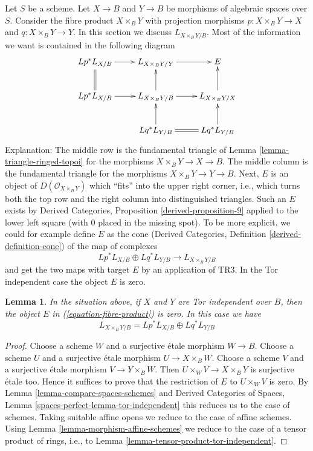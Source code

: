 \documentclass{stacks-project}
\theoremstyle{plain}
\newtheorem{lemma}[subsection]{Lemma}
\theoremstyle{definition}
\theoremstyle{remark}
\numberwithin{equation}{subsection}
\begin{document}
\noindent
Let $S$ be a scheme. Let $X \to B$ and $Y \to B$ be morphisms of algebraic
spaces over $S$. Consider the fibre product $X \times_B Y$ with projection
morphisms $p : X \times_B Y \to X$ and $q : X \times_B Y \to Y$.
In this section we discuss $L_{X \times_B Y/B}$. Most of the
information we want is contained in the following diagram
\begin{equation}
\label{equation-fibre-product}
\vcenter{
\xymatrix{
Lp^*L_{X/B} \ar[r] &
L_{X \times_B Y/Y} \ar[r] &
E \\
Lp^*L_{X/B} \ar[r] \ar@{=}[u] &
L_{X \times_B Y/B} \ar[r] \ar[u] &
L_{X \times_B Y/X} \ar[u] \\
 &
Lq^*L_{Y/B} \ar[u] \ar@{=}[r] &
Lq^*L_{Y/B} \ar[u]
}
}
\end{equation}
Explanation: The middle row is the fundamental triangle of
Lemma \ref{lemma-triangle-ringed-topoi} for the morphisms
$X \times_B Y \to X \to B$. The middle column is the fundamental triangle
for the morphisms $X \times_B Y \to Y \to B$.
Next, $E$ is an object of $D(\mathcal{O}_{X \times_B Y})$ which ``fits''
into the upper right corner, i.e., which turns both the top row
and the right column into distinguished triangles. Such an $E$
exists by Derived Categories, Proposition \ref{derived-proposition-9}
applied to the lower left square (with $0$ placed in the missing
spot). To be more explicit, we could for example define $E$ as the cone
(Derived Categories, Definition \ref{derived-definition-cone})
of the map of complexes
$$
Lp^*L_{X/B} \oplus Lq^*L_{Y/B} \longrightarrow L_{X \times_B Y/B}
$$
and get the two maps with target $E$ by an application of TR3.
In the Tor independent case the object $E$ is zero.

\begin{lemma}
\label{lemma-fibre-product-tor-independent}
In the situation above, if $X$ and $Y$ are Tor independent over $B$, then
the object $E$ in (\ref{equation-fibre-product}) is zero. In this case we
have
$$
L_{X \times_B Y/B} = Lp^*L_{X/B} \oplus Lq^*L_{Y/B}
$$
\end{lemma}

\begin{proof}
Choose a scheme $W$ and a surjective \'etale morphism $W \to B$.
Choose a scheme $U$ and a surjective \'etale morphism $U \to X \times_B W$.
Choose a scheme $V$ and a surjective \'etale morphism $V \to Y \times_B W$.
Then $U \times_W V \to X \times_B Y$ is surjective \'etale too.
Hence it suffices to prove that the restriction of $E$ to $U \times_W V$
is zero. By Lemma \ref{lemma-compare-spaces-schemes} and
Derived Categories of Spaces, Lemma \ref{spaces-perfect-lemma-tor-independent}
this reduces us to the case of schemes.
Taking suitable affine opens we reduce to the case of affine schemes.
Using 
Lemma \ref{lemma-morphism-affine-schemes}
we reduce to the case of a tensor product of rings, i.e., to
Lemma \ref{lemma-tensor-product-tor-independent}.
\end{proof}
\end{document}
